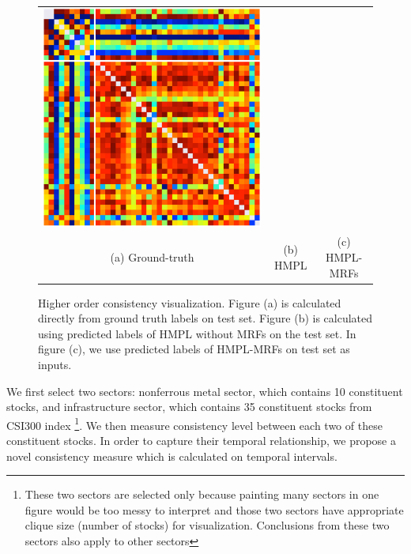 \documentclass[sigconf]{acmart}
\begin{document}
\begin{figure}[t]
\begin{tabular}{ccc}
    \includegraphics[width=0.45\columnwidth]{Methodology/figures/mrf.png}
\\                                                                        {\small (a) Ground-truth} & {\small (b) HMPL } & {\small (c) HMPL-MRFs} 
  \end{tabular}\vspace{-2mm}
  \caption{\label{fig:consistency} Higher order consistency
    visualization. Figure (a) is calculated
    directly from ground truth labels on test set.
    Figure (b)
    is calculated using predicted labels of HMPL without MRFs on the
    test set.
    In figure (c), we use predicted labels of
    HMPL-MRFs on test set as inputs.}\vspace{0mm}
\end{figure}

We first select two sectors: nonferrous metal sector, which
contains 10 constituent stocks, and infrastructure sector, which
contains 35 constituent stocks from CSI300 index \footnote{These
  two sectors are selected only because painting many sectors in
  one figure would be too messy to interpret and those two
  sectors have appropriate clique size (number of stocks) for
  visualization. Conclusions from these two sectors also apply to
  other sectors}. We then measure consistency level between each
two of these constituent stocks. In order to capture their
temporal relationship, we propose a novel consistency measure
which is calculated on temporal intervals.
\end{document}
